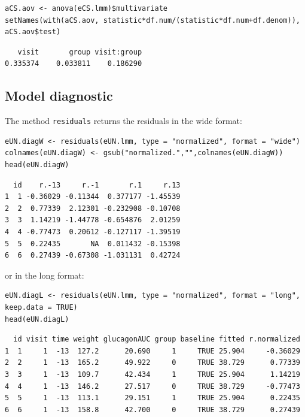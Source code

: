 \documentclass[12pt]{article}
\begin{document}
\lstset{language=r,label= ,caption= ,captionpos=b,numbers=none}
\begin{lstlisting}
aCS.aov <- anova(eCS.lmm)$multivariate
setNames(with(aCS.aov, statistic*df.num/(statistic*df.num+df.denom)), aCS.aov$test)
\end{lstlisting}

\begin{verbatim}
   visit       group visit:group 
0.335374    0.033811    0.186290
\end{verbatim}



\bigskip


\clearpage

\subsection{Model diagnostic}
\label{sec:orgc1eaeda}

The method \texttt{residuals} returns the residuals in the wide format:
\lstset{language=r,label= ,caption= ,captionpos=b,numbers=none}
\begin{lstlisting}
eUN.diagW <- residuals(eUN.lmm, type = "normalized", format = "wide")
colnames(eUN.diagW) <- gsub("normalized.","",colnames(eUN.diagW))
head(eUN.diagW)
\end{lstlisting}

\begin{verbatim}
  id    r.-13     r.-1       r.1     r.13
1  1 -0.36029 -0.11344  0.377177 -1.45539
2  2  0.77339  2.12301 -0.232908 -0.10708
3  3  1.14219 -1.44778 -0.654876  2.01259
4  4 -0.77473  0.20612 -0.127117 -1.39519
5  5  0.22435       NA  0.011432 -0.15398
6  6  0.27439 -0.67308 -1.031131  0.42724
\end{verbatim}


or in the long format:
\lstset{language=r,label= ,caption= ,captionpos=b,numbers=none}
\begin{lstlisting}
eUN.diagL <- residuals(eUN.lmm, type = "normalized", format = "long", keep.data = TRUE)
head(eUN.diagL)
\end{lstlisting}

\begin{verbatim}
  id visit time weight glucagonAUC group baseline fitted r.normalized
1  1     1  -13  127.2      20.690     1     TRUE 25.904     -0.36029
2  2     1  -13  165.2      49.922     0     TRUE 38.729      0.77339
3  3     1  -13  109.7      42.434     1     TRUE 25.904      1.14219
4  4     1  -13  146.2      27.517     0     TRUE 38.729     -0.77473
5  5     1  -13  113.1      29.151     1     TRUE 25.904      0.22435
6  6     1  -13  158.8      42.700     0     TRUE 38.729      0.27439
\end{verbatim}
\end{document}
